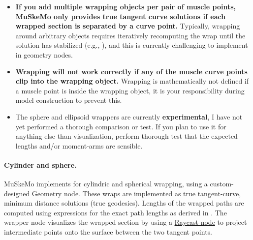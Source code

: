 \documentclass{article}
\begin{document}
\begin{itemize}
\item \textbf{If you add multiple wrapping objects per pair of muscle points, MuSkeMo only provides true tangent curve solutions if each wrapped section is separated by a curve point.} Typically, wrapping around arbitrary objects requires iteratively recomputing the wrap until the solution has stabilized (e.g., \cite{garnerObstacleSetMethodRepresenting2000,scholzFastMultiobstacleMuscle2016}), and this is currently challenging to implement in geometry nodes.
\item \textbf{Wrapping will not work correctly if any of the muscle curve points clip into the wrapping object.} Wrapping is mathematically not defined if a muscle point is inside the wrapping object, it is your responsibility during model construction to prevent this.
\item The sphere and ellipsoid wrappers are currently \textbf{experimental}, I have not yet performed a thorough comparison or test. If you plan to use it for anything else than visualization, perform thorough test that the expected lengths and/or moment-arms are sensible.
\end{itemize}


\paragraph{Cylinder and sphere.}
MuSkeMo implements \cite{garnerObstacleSetMethodRepresenting2000} for cylindric and spherical wrapping, using a custom-designed Geometry node. These wraps are implemented as true tangent-curve, minimum distance solutions (true geodesics). Lengths of the wrapped paths are computed using expressions for the exact path lengths as derived in \cite{garnerObstacleSetMethodRepresenting2000}. The wrapper node visualizes the wrapped section by using a \href{https://docs.blender.org/manual/en/latest/modeling/geometry_nodes/geometry/sample/raycast.html}{Raycast node} to project intermediate points onto the surface between the two tangent points.
\end{document}
